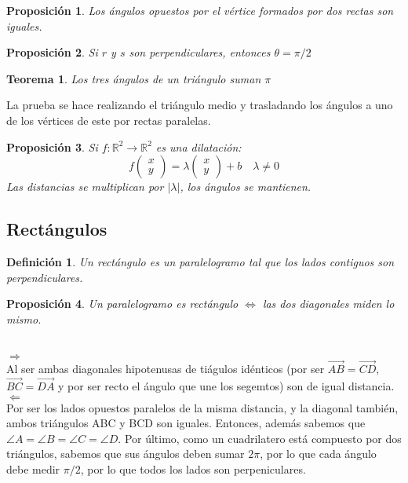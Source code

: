 \documentclass[11pt, a4paper, titlepage]{article}
\makeatletter
\renewenvironment{proof}[1][\proofname] {\vspace{-15pt}\par\pushQED{\qed}\normalfont\topsep6\p@\@plus6\p@\relax\trivlist\item[\hskip\labelsep\it#1\@addpunct{.}]\ignorespaces}{\popQED\endtrivlist\@endpefalse}
\newcommand{\R}{\mathbb{R}}
\renewcommand{\vec}{\overrightarrow}
\renewenvironment{proof}[1][\proofname] {\par\pushQED{\qed}\normalfont\topsep6\p@\@plus6\p@\relax\trivlist\item[\hskip\labelsep\itshape\sffamily#1\@addpunct{.}]\ignorespaces}{\popQED\endtrivlist\@endpefalse}
\theoremstyle{theorem-style}
\newtheorem{nth}{Teorema}[section]
\newtheorem{nprop}{Proposición}[section]
\theoremstyle{definition-style}
\newtheorem{ndef}{Definición}[section]
\theoremstyle{remark-style}
\theoremstyle{example-style}
\makeatother
\begin{document}
\begin{nprop}
  Los ángulos opuestos por el vértice formados por dos rectas son iguales.
\end{nprop}


\begin{nprop}
  Si $r$ y $s$ son perpendiculares, entonces $\theta = \pi/2$
\end{nprop}

\begin{nth}
  Los tres ángulos de un triángulo suman $\pi$
\end{nth}
\begin{proof}
  La prueba se hace realizando el triángulo medio y trasladando los ángulos a uno de los vértices de este por rectas paralelas.
\end{proof}

\begin{nprop}
  Si $f:\R^2 \to \R^2$ es una dilatación:
  \[
    f \begin{pmatrix}
      x\\
      y 
    \end{pmatrix} = \lambda\begin{pmatrix}
      x\\
      y 
    \end{pmatrix} + b \quad \lambda \ne 0
  \]
  Las distancias se multiplican por $|\lambda|$, los ángulos se mantienen.
\end{nprop}




\subsection{Rectángulos}
\begin{ndef}
  Un rectángulo es un paralelogramo tal que los lados contiguos son perpendiculares.
\end{ndef}


\begin{nprop}
  Un paralelogramo es rectángulo $\iff$ las dos diagonales miden lo mismo.
\end{nprop}
\begin{proof}\hfill \\
  $\boxed{\Rightarrow}$\\
  Al ser ambas diagonales hipotenusas de tiágulos idénticos (por ser $\vec{AB}=\vec{CD}$, $\vec{BC}=\vec{DA}$ y por ser recto el ángulo que une los segemtos) son de igual distancia.\\
  $\boxed{\Leftarrow}$ \\
  Por ser los lados opuestos paralelos de la misma distancia, y la diagonal también, ambos triángulos ABC y BCD son iguales. Entonces, además sabemos que  $\angle A = \angle
 B = \angle C  = \angle D$. Por último, como un cuadrilatero está compuesto por dos triángulos, sabemos que sus ángulos deben sumar $2\pi$, por lo que cada ángulo debe
  medir $\pi/2$, por lo que todos los lados son perpeniculares.
  
\end{proof}
\end{document}

